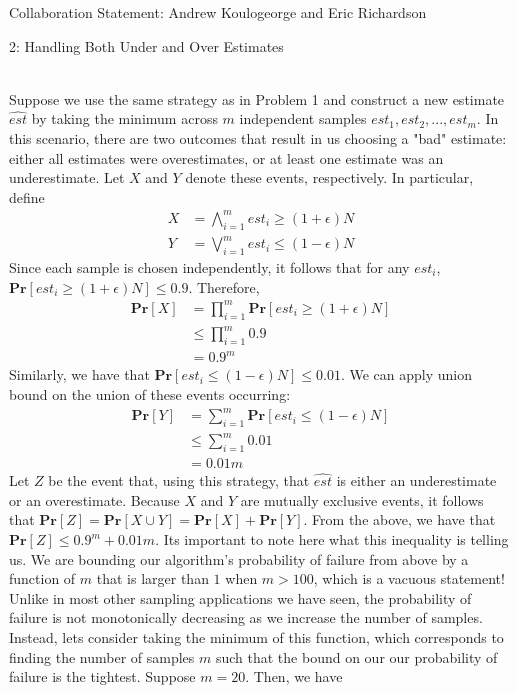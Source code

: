\documentclass[12pt]{article}
\begin{document}

Collaboration Statement: Andrew Koulogeorge and Eric Richardson 

\begin{problem}{2: Handling Both Under and Over Estimates}
\end{problem}
\begin{solution} \ \\
Suppose we use the same strategy as in Problem 1 and construct a new estimate $\hat{est}$ by taking the minimum across $m$ independent samples $est_1, est_2, ..., est_m$. In this scenario, there are two outcomes that result in us choosing a "bad" estimate: either all estimates were overestimates, or at least one estimate was an underestimate. Let $X$ and $Y$ denote these events, respectively. In particular, define 
\begin{align*}
    X &= \bigwedge\limits_{i=1}^m est_i \geq (1 + \epsilon)N \\
    Y &= \bigvee\limits_{i=1}^m est_i \leq (1 - \epsilon)N
\end{align*}
Since each sample is chosen independently, it follows that for any $est_i$, $\textbf{Pr}[est_i \geq (1 + \epsilon)N] \leq 0.9$. Therefore,
\begin{align*}
    \textbf{Pr}[X] &= \prod\limits_{i=1}^m \textbf{Pr}[est_i \geq (1 + \epsilon)N] \\
    &\leq \prod\limits_{i=1}^m 0.9 \\
    &= 0.9^m
\end{align*}
Similarly, we have that $\textbf{Pr}[est_i \leq (1 - \epsilon)N] \leq 0.01$. We can apply union bound on the union of these events occurring: 
\begin{align*}
    \textbf{Pr}[Y] &= \sum\limits_{i=1}^m \textbf{Pr}[est_i \leq (1 - \epsilon)N] \\ 
    &\leq \sum\limits_{i=1}^m 0.01 \\
    &= 0.01m
\end{align*}
Let $Z$ be the event that, using this strategy, that $\hat{{est}}$ is either an underestimate or an overestimate. Because $X$ and $Y$ are mutually exclusive events, it follows that $\textbf{Pr}[Z] = \textbf{Pr}[X\cup Y] = \textbf{Pr}[X] + \textbf{Pr}[Y]$. From the above, we have that $\textbf{Pr}[Z] \leq 0.9^m + 0.01m$. Its important to note here what this inequality is telling us. We are bounding our algorithm's probability of failure from above by a function of $m$ that is larger than $1$ when $m > 100$, which is a vacuous statement! Unlike in most other sampling applications we have seen, the probability of failure is not monotonically decreasing as we increase the number of samples. Instead, lets consider taking the minimum of this function, which corresponds to finding the number of samples $m$ such that the bound on our our probability of failure is the tightest. Suppose $m = 20$. Then, we have

\end{solution}
\end{document}
